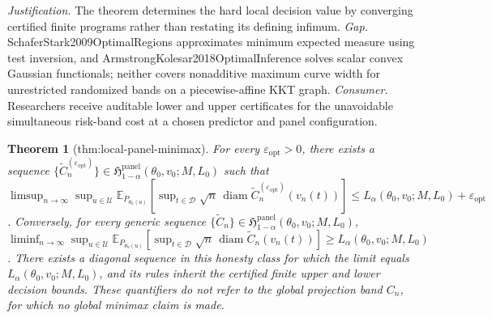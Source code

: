 \documentclass{article}
\newtheorem{theorem}{Theorem}
\begin{document}
\par\smallskip\noindent \textit{Justification.} The theorem determines the hard local decision value by converging certified finite programs rather than restating its defining infimum. \textit{Gap.} SchaferStark2009OptimalRegions approximates minimum expected measure using test inversion, and ArmstrongKolesar2018OptimalInference solves scalar convex Gaussian functionals; neither covers nonadditive maximum curve width for unrestricted randomized bands on a piecewise-affine KKT graph. \textit{Consumer.} Researchers receive auditable lower and upper certificates for the unavoidable simultaneous risk-band cost at a chosen predictor and panel configuration.

\begin{theorem}[thm:local-panel-minimax]\label{thm:local-panel-minimax}
For every \(\varepsilon_{\mathrm{opt}}>0\), there exists a sequence \(\{\widetilde C_n^{(\varepsilon_{\mathrm{opt}})}\}\in\mathfrak H^{\mathrm{panel}}_{1-\alpha}(\theta_0,v_0;M,L_0)\) such that \(\limsup_{n\to\infty}\sup_{u\in\mathcal U}\mathbb E_{P_{\theta_n(u)}}[\sup_{t\in\mathcal D}\sqrt n\,\operatorname{diam}\widetilde C_n^{(\varepsilon_{\mathrm{opt}})}(v_n(t))]\le L_\alpha(\theta_0,v_0;M,L_0)+\varepsilon_{\mathrm{opt}}\). Conversely, for every generic sequence \(\{\widetilde C_n\}\in\mathfrak H^{\mathrm{panel}}_{1-\alpha}(\theta_0,v_0;M,L_0)\), \(\liminf_{n\to\infty}\sup_{u\in\mathcal U}\mathbb E_{P_{\theta_n(u)}}[\sup_{t\in\mathcal D}\sqrt n\,\operatorname{diam}\widetilde C_n(v_n(t))]\ge L_\alpha(\theta_0,v_0;M,L_0)\). There exists a diagonal sequence in this honesty class for which the limit equals \(L_\alpha(\theta_0,v_0;M,L_0)\), and its rules inherit the certified finite upper and lower decision bounds. These quantifiers do not refer to the global projection band \(C_n\), for which no global minimax claim is made.
\end{theorem}
\end{document}
